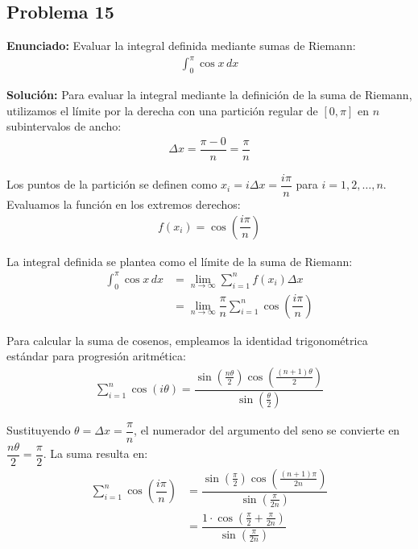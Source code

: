 \subsection*{Problema 15}
\textbf{Enunciado:} Evaluar la integral definida mediante sumas de Riemann:
\begin{align*}
\int_{0}^{\pi} \cos x \, dx
\end{align*}

\textbf{Solución:}
Para evaluar la integral mediante la definición de la suma de Riemann, utilizamos el límite por la derecha con una partición regular de $[0, \pi]$ en $n$ subintervalos de ancho:
\begin{align*}
\Delta x = \dfrac{\pi - 0}{n} = \dfrac{\pi}{n}
\end{align*}

Los puntos de la partición se definen como $x_i = i \Delta x = \dfrac{i\pi}{n}$ para $i = 1, 2, \dots, n$. Evaluamos la función en los extremos derechos:
\begin{align*}
f(x_i) = \cos\left(\dfrac{i\pi}{n}\right)
\end{align*}

La integral definida se plantea como el límite de la suma de Riemann:
\begin{align*}
\int_{0}^{\pi} \cos x \, dx &= \lim_{n \to \infty} \sum_{i=1}^n f(x_i)\Delta x \\
&= \lim_{n \to \infty} \dfrac{\pi}{n} \sum_{i=1}^n \cos\left(\dfrac{i\pi}{n}\right)
\end{align*}

Para calcular la suma de cosenos, empleamos la identidad trigonométrica estándar para progresión aritmética:
\begin{align*}
\sum_{i=1}^n \cos(i\theta) = \dfrac{\sin\left(\frac{n\theta}{2}\right)\cos\left(\frac{(n+1)\theta}{2}\right)}{\sin\left(\frac{\theta}{2}\right)}
\end{align*}

Sustituyendo $\theta = \Delta x = \dfrac{\pi}{n}$, el numerador del argumento del seno se convierte en $\dfrac{n\theta}{2} = \dfrac{\pi}{2}$. La suma resulta en:
\begin{align*}
\sum_{i=1}^n \cos\left(\dfrac{i\pi}{n}\right) &= \dfrac{\sin\left(\frac{\pi}{2}\right)\cos\left(\frac{(n+1)\pi}{2n}\right)}{\sin\left(\frac{\pi}{2n}\right)} \\
&= \dfrac{1 \cdot \cos\left(\frac{\pi}{2} + \frac{\pi}{2n}\right)}{\sin\left(\frac{\pi}{2n}\right)}
\end{align*}

